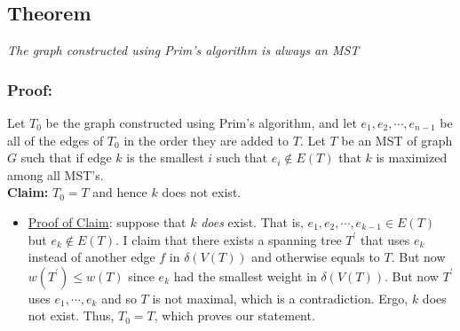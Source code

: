 \documentclass{report}
\begin{document}
\subsection{Theorem}
\begin{center}
\textit{The graph constructed using Prim's algorithm is always an MST}
\end{center}
\subsubsection{Proof:}
Let $T_0$ be the graph constructed using Prim's algorithm, and let $e_1, e_2, \cdots, e_{n-1}$ be all of the edges of $T_0$ in the order they are added to $T$. Let $T$ be an MST of graph $G$ such that if edge $k$ is the smallest $i$ such that $e_i \not\in E(T)$ that $k$ is maximized among all MST's. \\
\textbf{Claim:} $T_0 = T$ and hence $k$ does not exist.
\begin{itemize}
\item \underline{Proof of Claim}: suppose that $k$ \textit{does} exist. That is, $e_1, e_2, \cdots, e_{k-1} \in E(T)$ but $e_k \not\in E(T)$. I claim that there exists a spanning tree $T^\prime$ that uses $e_k$ instead of another edge $f$ in $\delta(V(T))$ and otherwise equals to $T$. But now $w(T^\prime) \leq w(T)$ since $e_k$ had the smallest weight in $\delta(V(T))$. But now $T^\prime$ uses $e_1, \cdots, e_k$ and so $T$ is not maximal, which is a contradiction. Ergo, $k$ does not exist. Thus, $T_0 = T$, which proves our statement.
\end{itemize}

\end{document}
